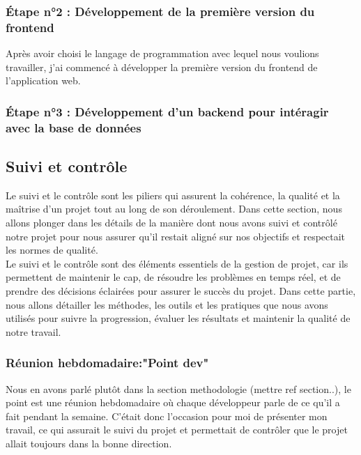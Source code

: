 \documentclass[a4paper, 12pt, french]{article}
\begin{document}
			
				\subsubsection{Étape n°2 : Développement de la première version du frontend}
					Après avoir choisi le langage de programmation avec lequel nous voulions travailler, j'ai commencé à développer la première version du frontend de l'application web.
					
					
				\subsubsection{Étape n°3 : Développement d'un backend pour intéragir avec la base de données}
			
			\subsection{Suivi et contrôle}
				Le suivi et le contrôle sont les piliers qui assurent la cohérence, la qualité et la maîtrise d'un projet tout au long de son déroulement. Dans cette section, nous allons plonger dans les détails de la manière dont nous avons suivi et contrôlé notre projet pour nous assurer qu'il restait aligné sur nos objectifs et respectait les normes de qualité.\\

				Le suivi et le contrôle sont des éléments essentiels de la gestion de projet, car ils permettent de maintenir le cap, de résoudre les problèmes en temps réel, et de prendre des décisions éclairées pour assurer le succès du projet. Dans cette partie, nous allons détailler les méthodes, les outils et les pratiques que nous avons utilisés pour suivre la progression, évaluer les résultats et maintenir la qualité de notre travail.

				\subsubsection{Réunion hebdomadaire:"Point dev"}
					Nous en avons parlé plutôt dans la section methodologie (mettre ref section..), le point est une réunion hebdomadaire où chaque développeur parle de ce qu'il a fait pendant la semaine. C'était donc l'occasion pour moi de présenter mon travail, ce qui assurait le suivi du projet et permettait de contrôler que le projet allait toujours dans la bonne direction.
					
\end{document}
